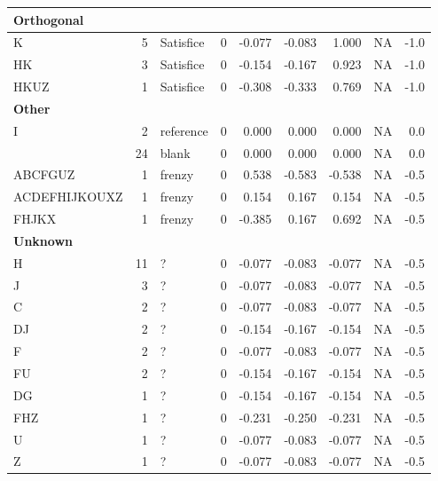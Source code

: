 \documentclass[
  letterpaper,
  DIV=11,
  numbers=noendperiod]{scrreprt}
\begin{document}
\begin{tabular}[t]{l|r|l|r|r|r|r|r|r}
\hline
\multicolumn{9}{l}{\textbf{Orthogonal}}\\
\hline
\hspace{1em}K & 5 & Satisfice & 0 & -0.077 & -0.083 & 1.000 & NA & -1.0\\
\hline
\hspace{1em}HK & 3 & Satisfice & 0 & -0.154 & -0.167 & 0.923 & NA & -1.0\\
\hline
\hspace{1em}HKUZ & 1 & Satisfice & 0 & -0.308 & -0.333 & 0.769 & NA & -1.0\\
\hline
\multicolumn{9}{l}{\textbf{Other}}\\
\hline
\hspace{1em}I & 2 & reference & 0 & 0.000 & 0.000 & 0.000 & NA & 0.0\\
\hline
\hspace{1em} & 24 & blank & 0 & 0.000 & 0.000 & 0.000 & NA & 0.0\\
\hline
\hspace{1em}ABCFGUZ & 1 & frenzy & 0 & 0.538 & -0.583 & -0.538 & NA & -0.5\\
\hline
\hspace{1em}ACDEFHIJKOUXZ & 1 & frenzy & 0 & 0.154 & 0.167 & 0.154 & NA & -0.5\\
\hline
\hspace{1em}FHJKX & 1 & frenzy & 0 & -0.385 & 0.167 & 0.692 & NA & -0.5\\
\hline
\multicolumn{9}{l}{\textbf{Unknown}}\\
\hline
\hspace{1em}H & 11 & ? & 0 & -0.077 & -0.083 & -0.077 & NA & -0.5\\
\hline
\hspace{1em}J & 3 & ? & 0 & -0.077 & -0.083 & -0.077 & NA & -0.5\\
\hline
\hspace{1em}C & 2 & ? & 0 & -0.077 & -0.083 & -0.077 & NA & -0.5\\
\hline
\hspace{1em}DJ & 2 & ? & 0 & -0.154 & -0.167 & -0.154 & NA & -0.5\\
\hline
\hspace{1em}F & 2 & ? & 0 & -0.077 & -0.083 & -0.077 & NA & -0.5\\
\hline
\hspace{1em}FU & 2 & ? & 0 & -0.154 & -0.167 & -0.154 & NA & -0.5\\
\hline
\hspace{1em}DG & 1 & ? & 0 & -0.154 & -0.167 & -0.154 & NA & -0.5\\
\hline
\hspace{1em}FHZ & 1 & ? & 0 & -0.231 & -0.250 & -0.231 & NA & -0.5\\
\hline
\hspace{1em}U & 1 & ? & 0 & -0.077 & -0.083 & -0.077 & NA & -0.5\\
\hline
\hspace{1em}Z & 1 & ? & 0 & -0.077 & -0.083 & -0.077 & NA & -0.5\\
\hline
\end{tabular}
\end{document}
